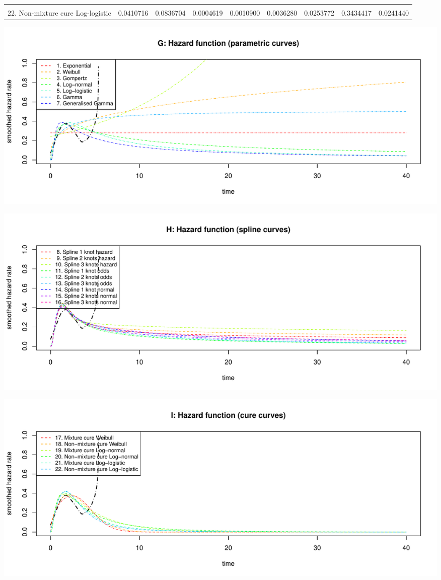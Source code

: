 \documentclass[]{article}
\begin{document}
\begin{table}
{\begin{tabular}[t]{lrrrrrrrr}
\cellcolor{gray!6}{21. Mixture cure Log-logistic} & \cellcolor{gray!6}{0.0439682} & \cellcolor{gray!6}{0.0847543} & \cellcolor{gray!6}{0.0005930} & \cellcolor{gray!6}{0.0014141} & \cellcolor{gray!6}{0.0047437} & \cellcolor{gray!6}{0.0321531} & \cellcolor{gray!6}{0.3414361} & \cellcolor{gray!6}{0.0305649}\\
22. Non-mixture cure Log-logistic & 0.0410716 & 0.0836704 & 0.0004619 & 0.0010900 & 0.0036280 & 0.0253772 & 0.3434417 & 0.0241440\\
\bottomrule
\end{tabular}}
\end{table}

\begin{flushleft}\includegraphics[height=0.29\textheight]{Images/validate_extrapolation3-7} \end{flushleft}

\begin{flushleft}\includegraphics[height=0.29\textheight]{Images/validate_extrapolation3-8} \end{flushleft}

\begin{flushleft}\includegraphics[height=0.29\textheight]{Images/validate_extrapolation3-9} \end{flushleft}
\end{document}
